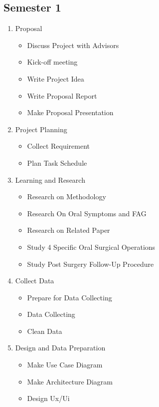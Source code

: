 \documentclass[12pt,oneside,openright,a4paper]{cpe-english-project}
\begin{document}
  \subsection{Semester 1}
    \begin{enumerate}
      \item Proposal
        \begin{itemize}
          \item Discuss Project with Advisors
          \item Kick-off meeting
          \item Write Project Idea
          \item Write Proposal Report
          \item Make Proposal Presentation          
        \end{itemize}
      \item Project Planning
        \begin{itemize}
          \item Collect Requirement
          \item Plan Task Schedule          
        \end{itemize}
      \item Learning and Research
        \begin{itemize}
          \item Research on Methodology
          \item Research On Oral Symptoms and FAG
          \item Research on Related Paper
          \item Study 4 Specific Oral Surgical Operations
          \item Study Post Surgery Follow-Up Procedure
        \end{itemize}
      \item Collect Data
        \begin{itemize}
          \item Prepare for Data Collecting
          \item Data Collecting
          \item Clean Data                 
        \end{itemize}
      \item Design and Data Preparation
        \begin{itemize}
          \item Make Use Case Diagram
          \item Make Architecture Diagram
          \item Design Ux/Ui

\end{itemize}
\end{enumerate}
\end{document}
